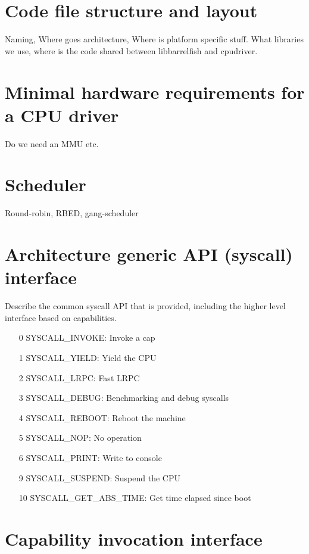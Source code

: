 \documentclass[a4paper,11pt,twoside]{report}
\begin{document}
{{\section{Code file structure and layout}
Naming, Where goes architecture, Where is platform specific stuff.
What libraries we use, where is the code shared between libbarrelfish
and cpudriver.

\section{Minimal hardware requirements for a CPU driver}
Do we need an MMU etc.

\section{Scheduler}
Round-robin, RBED, gang-scheduler

\section{Architecture generic API (syscall) interface}
Describe the common syscall API that is provided, including
the higher level interface based on capabilities.

\begin{itemize}
\item[0] SYSCALL\_INVOKE: Invoke a cap
\item[1] SYSCALL\_YIELD: Yield the CPU
\item[2] SYSCALL\_LRPC: Fast LRPC
\item[3] SYSCALL\_DEBUG: Benchmarking and debug syscalls
\item[4] SYSCALL\_REBOOT: Reboot the machine
\item[5] SYSCALL\_NOP: No operation
\item[6] SYSCALL\_PRINT: Write to console
\item[9] SYSCALL\_SUSPEND: Suspend the CPU
\item[10] SYSCALL\_GET\_ABS\_TIME: Get time elapsed since boot

\end{itemize}

\section{Capability invocation interface}

}}
\end{document}

